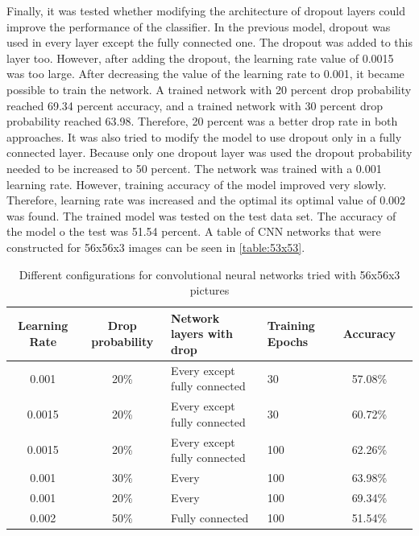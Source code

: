 Finally, it was tested whether modifying the architecture of dropout layers could improve the performance of the classifier. In the previous model, dropout was used in every layer except the fully connected one. The dropout was added to this layer too. However, after adding the dropout, the learning rate value of 0.0015 was too large. After decreasing the value of the learning rate to 0.001, it became possible to train the network. A trained network with 20 percent drop probability reached 69.34 percent accuracy, and a trained network with 30 percent drop probability reached 63.98. Therefore, 20 percent was a better drop rate in both approaches. It was also tried to modify the model to use dropout only in a fully connected layer. Because only one dropout layer was used the dropout probability needed to be increased to 50 percent. The network was trained with a 0.001 learning rate. However, training accuracy of the model improved very slowly. Therefore, learning rate was increased and the optimal its optimal value of 0.002 was found. The trained model was tested on the test data set. The accuracy of the model o the test was 51.54 percent. A table of CNN networks that were constructed for 56x56x3 images can be seen in \autoref{table:53x53}.


\begin{table}[h]
\begin{center}
\begin{tabular}{ |c|c|p{3.3 cm}|p{2 cm}|c|c|} 
 \hline
 Learning Rate & Drop probability & Network layers with drop &Training Epochs&Accuracy \\   \hline
0.001   &   20\%  & Every except fully  connected  & 30 & 57.08\% \\ \hline
0.0015    &   20\%   &  Every  except fully connected  & 30  & 60.72\% \\ \hline
0.0015    &   20\%   &  Every  except fully connected  & 100  & 62.26\% \\ \hline
0.001    &   30\%   &  Every  & 100  & 63.98\% \\ \hline
0.001    &   20\%   &  Every  & 100  & 69.34\% \\ \hline
0.002    &   50\%   &  Fully connected& 100  & 51.54\% \\  \hline
\end{tabular}
\caption{Different configurations for convolutional neural networks tried with 56x56x3 pictures}
\label{table:53x53}
\end{center}
\end{table}




